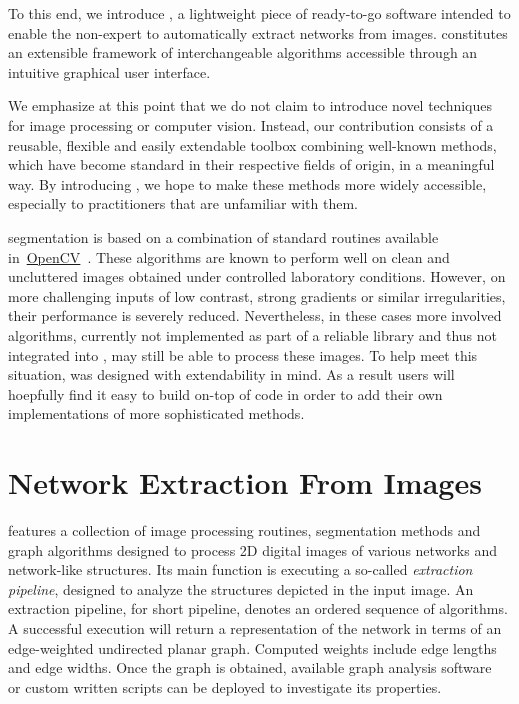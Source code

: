 	To this end, we introduce \NEFI, a lightweight piece of ready-to-go software intended to enable the non-expert to automatically extract networks from images. \NEFI constitutes an extensible framework of interchangeable algorithms accessible through an intuitive graphical user interface. 

	We emphasize at this point that we do not claim to introduce novel techniques for image processing or computer vision. Instead, our contribution consists of a reusable, flexible and easily extendable toolbox combining well-known methods, which have become standard in their respective fields of origin, in a meaningful way. By introducing \NEFI, we hope to make these methods more widely accessible, especially to practitioners that are unfamiliar with them.

	\NEFIs segmentation is based on a combination of standard routines available in~\href{http://opencv.org/}{OpenCV}~\cite{opencv}. These algorithms are known to perform well on clean and uncluttered images obtained under controlled laboratory conditions. However, on more challenging inputs of low contrast, strong gradients or similar irregularities, their performance is severely reduced. Nevertheless, in these cases more involved algorithms, currently not implemented as part of a reliable library and thus not integrated into \NEFI, may still be able to process these images. To help meet this situation, \NEFI was designed with extendability in mind. As a result users will hoepfully find it easy to build on-top of \NEFIs code in order to add their own implementations of more sophisticated methods. 

\section{Network Extraction From Images}	%

	\NEFI features a collection of image processing routines, segmentation methods and graph algorithms designed to process 2D digital images of various networks and network-like structures. Its main function is executing a so-called \emph{extraction pipeline}, designed to analyze the structures depicted in the input image. An extraction pipeline, for short pipeline, denotes an ordered sequence of algorithms. A successful execution will return a representation of the network in terms of an edge-weighted undirected planar graph. Computed weights include edge lengths and edge widths. Once the graph is obtained, available graph analysis software~\cite{ICWSM09154,snap,batagelj1998pajek,5437689,loscalzo2008social,networkx} or custom written scripts can be deployed to investigate its properties.

